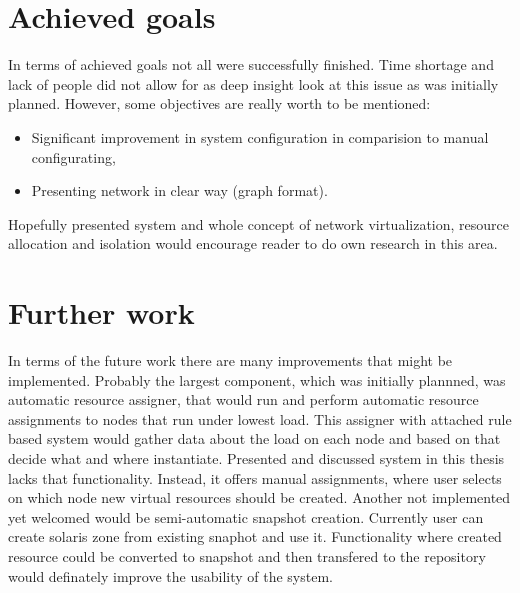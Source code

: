 \documentclass[11pt]{book}
\begin{document}
    \section{Achieved goals}
		\label{sub:sum:achieved}
		
		In terms of achieved goals not all were successfully finished. Time shortage and lack of people did not allow 
		for as deep insight look at this issue as was initially planned. However, some objectives are really worth to
		be mentioned:
	  
		\begin{itemize}
			\item{Significant improvement in system configuration in comparision to manual configurating,}
			\item{Presenting network in clear way (graph format).}
		\end{itemize}
		
	    Hopefully presented system and whole concept of network virtualization, resource allocation and isolation 
	    would encourage reader to do own research in this area.
		
		

    \section{Further work}
		\label{sub:sum:further}
	
      In terms of the future work there are many improvements that might be implemented. Probably the largest component,
      which was initially plannned, was automatic resource assigner, that would run and perform automatic resource
      assignments to nodes that run under lowest load. This assigner with attached rule based system would gather data
      about the load on each node and based on that decide what and where instantiate. Presented and discussed system in
      this thesis lacks that functionality. Instead, it offers manual assignments, where user selects on which node new
      virtual resources should be created. Another not implemented yet welcomed would be semi-automatic snapshot creation. 
      Currently user can create solaris zone from existing snaphot and use it. Functionality where created resource could be 
      converted to snapshot and then transfered to the repository would definately improve the usability of the system.


  
  
\end{document}
